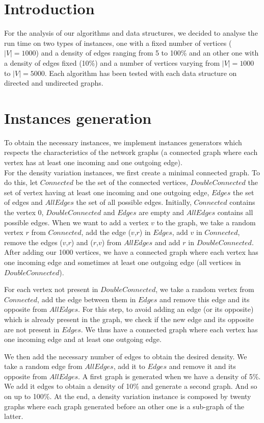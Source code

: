 \section{Introduction}
For the analysis of our algorithms and data structures, we decided to analyse the run time on two types of instances, one with a fixed number of vertices ($|V|=1000$) and a density of edges ranging from 5 to 100\% and an other one with a density of edges fixed (10\%) and a number of vertices varying from $|V|=1000$ to $|V|=5000$. Each algorithm has been tested with each data structure on directed and undirected graphs.

\section{Instances generation}
To obtain the necessary instances, we implement instances generators which respects the characteristics of the network graphs (a connected graph where each vertex has at least one incoming and one outgoing edge). \\

For the density variation instances, we first create a minimal connected graph. To do this, let $Connected$ be the set of the connected vertices, $DoubleConnected$ the set of vertex having at least one incoming and one outgoing edge, $Edges$ the set of edges and $AllEdges$ the set of all possible edges. Initially, $Connected$ contains the vertex 0, $DoubleConnected$ and $Edges$ are empty and $AllEdges$ contains all possible edges. When we want to add a vertex $v$ to the graph, we take a random vertex $r$ from $Connected$, add the edge ($v$,$r$) in $Edges$, add $v$ in $Connected$, remove the edges ($v$,$r$) and ($r$,$v$) from $AllEdges$ and add $r$ in $DoubleConnected$. After adding our 1000 vertices, we have a connected graph where each vertex has one incoming edge and sometimes at least one outgoing edge (all vertices in $DoubleConnected$).

For each vertex not present in $DoubleConnected$, we take a random vertex from $Connected$, add the edge between them in $Edges$ and remove this edge and its opposite from $AllEdges$. For this step, to avoid adding an edge (or its opposite) which is already present in the graph, we check if the new edge and its opposite are not present in $Edges$. We thus have a connected graph where each vertex has one incoming edge and at least one outgoing edge.

We then add the necessary number of edges to obtain the desired density. We take a random edge from $AllEdges$, add it to $Edges$ and remove it and its opposite from $AllEdges$. A first graph is generated when we have a density of 5\%. We add it edges to obtain a density of 10\% and generate a second graph. And so on up to 100\%. At the end, a density variation instance is composed by twenty graphs where each graph generated before an other one is a sub-graph of the latter.

